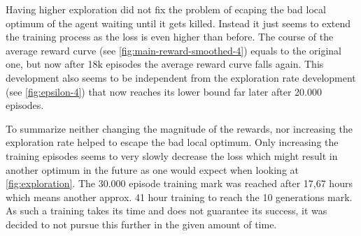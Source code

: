 Having higher exploration did not fix the problem of ecaping the bad local optimum of the agent waiting until it gets killed. Instead it just seems to extend the training process as the loss is even higher than before. The course of the average reward curve (see \autoref{fig:main-reward-smoothed-4}) equals to the original one, but now after 18k episodes the average reward curve falls again. This development also seems to be independent from the exploration rate development (see \autoref{fig:epsilon-4}) that now reaches its lower bound far later after 20.000 episodes. 

To summarize neither changing the magnitude of the rewards, nor increasing the exploration rate helped to escape the bad local optimum. Only increasing the training episodes seems to very slowly decrease the loss which might result in another optimum in the future as one would expect when looking at \autoref{fig:exploration}. The 30.000 episode training mark was reached after 17,67 hours which means another approx. 41 hour training to reach the 10 generations mark. As such a training takes its time and does not guarantee its success, it was decided to not pursue this further in the given amount of time. 



